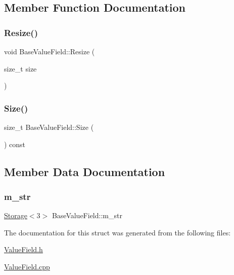 \subsection{Member Function Documentation}
\mbox{\label{structBaseValueField_a71e82d6bfc132cfdcb1312f1f5b6c84f}} 
\subsubsection{\texorpdfstring{Resize()}{Resize()}}
{\footnotesize\ttfamily void Base\+Value\+Field\+::\+Resize (\begin{DoxyParamCaption}\item[{size\+\_\+t}]{size }\end{DoxyParamCaption})\hspace{0.3cm}{\ttfamily [inline]}}

\mbox{\label{structBaseValueField_a32f9704f6b3685f3fc0b8b4913f4fad0}} 
\subsubsection{\texorpdfstring{Size()}{Size()}}
{\footnotesize\ttfamily size\+\_\+t Base\+Value\+Field\+::\+Size (\begin{DoxyParamCaption}{ }\end{DoxyParamCaption}) const\hspace{0.3cm}{\ttfamily [inline]}}



\subsection{Member Data Documentation}
\mbox{\label{structBaseValueField_a2ec4223a453889840cccafed504479bc}} 
\subsubsection{\texorpdfstring{m\+\_\+str}{m\_str}}
{\footnotesize\ttfamily \hyperlink{Includes_8h_ae7d375db701e28425a3faea2827f134b}{Storage}$<$3$>$ Base\+Value\+Field\+::m\+\_\+str\hspace{0.3cm}{\ttfamily [protected]}}



The documentation for this struct was generated from the following files\+:\begin{DoxyCompactItemize}
\item 
\hyperlink{ValueField_8h}{Value\+Field.\+h}\item 
\hyperlink{ValueField_8cpp}{Value\+Field.\+cpp}\end{DoxyCompactItemize}
